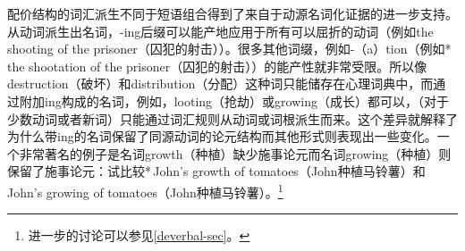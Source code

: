 
    配价结构的词汇派生不同于短语组合得到了来自于动源名词化证据的进一步支持\citep{Wechsler2008a}。从动词派生出名词，-ing后缀可以能产地应用于所有可以屈折的动词（例如the shooting of the prisoner（囚犯的射击））。很多其他词缀，例如-（a）tion（例如*\,the shootation of the prisoner（囚犯的射击））的能产性就非常受限。所以像destruction（破坏）和distribution（分配）这种词只能储存在心理词典中，而通过附加ing构成的名词，例如，looting（抢劫）或growing（成长）都可以，（对于少数动词或者新词）只能通过词汇规则从动词或词根派生而来\citep{Zucchi93a-u}。这个差异就解释了为什么带ing的名词保留了同源动词的论元结构而其他形式则表现出一些变化。一个非常著名的例子是名词growth（种植）缺少施事论元而名词growing（种植）则保留了施事论元：试比较*\,John's growth of tomatoes（John种植马铃薯）和John's growing of tomatoes（John种植马铃薯）\citep{Chomsky70a}。\footnote{进一步的讨论可以参见\ref{deverbal-sec}。} 
